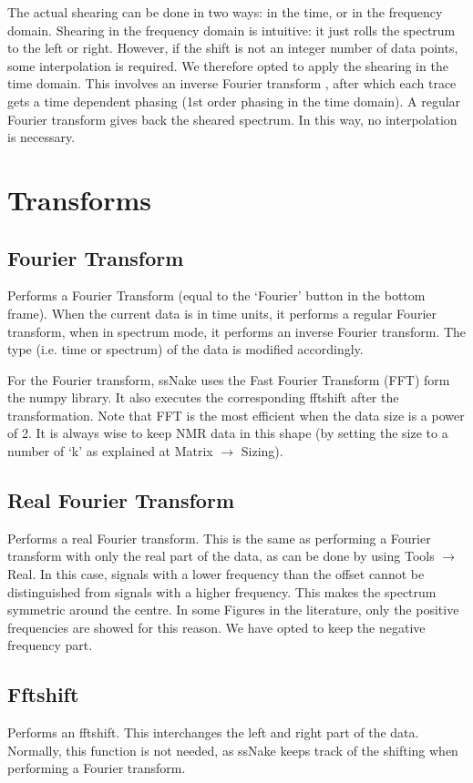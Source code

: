 \documentclass[11pt,a4paper]{article}
\begin{document}
The actual shearing can be done in two ways: in the time, or in the frequency domain. Shearing in the frequency domain is intuitive: it just rolls the spectrum to the left or right.
However, if the shift is not an integer number of data points, some interpolation is required. We therefore opted to apply the shearing in the time domain. This involves an inverse Fourier transform
, after which each trace gets a time dependent phasing (1st order phasing in the time domain). A regular Fourier transform gives back the sheared spectrum.
In this way, no interpolation is necessary.


\section{Transforms}
\subsection{Fourier Transform}
Performs a Fourier Transform (equal to the `Fourier' button in the bottom frame). When the current data is in time units,
it performs a regular Fourier transform, when in spectrum mode, it performs an inverse Fourier transform.
The type (i.e. time or spectrum) of the data is modified accordingly.

For the Fourier transform, ssNake uses the Fast Fourier Transform (FFT) form the numpy library. It also executes the
corresponding fftshift after the transformation. Note that FFT is the most efficient when the data size is a power of 2.
It is always wise to keep NMR data in this shape (by setting the size to a number of `k' as explained at Matrix $\rightarrow$ Sizing).



\subsection{Real Fourier Transform}
Performs a real Fourier transform. This is the same as performing a Fourier transform with only the real part of the data, as can be
done by using Tools $\rightarrow$ Real. In this case, signals with a lower frequency than the offset cannot be distinguished
from signals with a higher frequency. This makes the spectrum symmetric around the centre. In some Figures in the literature, only
the positive frequencies are showed for this reason. We have opted to keep the negative frequency part.



\subsection{Fftshift}
Performs an fftshift. This interchanges the left and right part of the data. Normally, this function is not needed, as ssNake keeps
track of the shifting when performing a Fourier transform.
\end{document}

